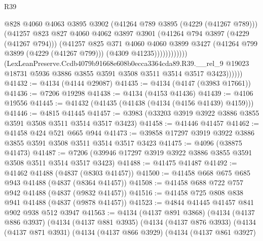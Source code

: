 \begin{lexlean}{R39}
\begin{coremodule}
                                @828
                                @4060
                                @4063
                                @3895
                                @3902
                                (@41264 @789 @3895 (@4229 (@41267 @789)))
                                (@41257
                                  @823
                                  @827
                                  @4060
                                  @4062
                                  @3897
                                  @3901
                                  (@41264 @794 @3897 (@4229 (@41267 @794)))
                                  (@41257
                                    @825
                                    @371
                                    @4060
                                    @4060
                                    @3899
                                    @3427
                                    (@41264 @799 @3899 (@4229 (@41267 @799)))
                                    (@4309 @41235))))))))))))
              (LexLeanPreserve.Ccdb4079b91668e608b0ecca3364cda89.R39.__rel_9
                @19023
                @18731
                @5936
                @3886
                @3855
                @3591
                @3508
                @3511
                @3514
                @3517
                @3423))))))
@41432 := @4134 (@4144 @29087)
@41435 := @4134 (@4147 (@3983 @17661))
@41436 := @7206 @19298
@41438 := @4134 (@4153 @41436)
@41439 := @4106 @19556
@41445 := @41432 (@41435 (@41438 (@4134 (@4156 @41439) @4159)))
@41446 := @4815 @41445
@41457 := @3983 (@33203 @3919 @3922 @3886 @3855 @3591 @3508 @3511 @3514 @3517 @3423)
@41458 := @41446 @41457
@41462 := @41458 @424 @521 @665 @944
@41473 := @39858 @17297 @3919 @3922 @3886 @3855 @3591 @3508 @3511 @3514 @3517 @3423
@41475 := @4096 (@38875 @41473)
@41487 := @7206 (@39946 @17297 @3919 @3922 @3886 @3855 @3591 @3508 @3511 @3514 @3517 @3423)
@41488 := @41475 @41487
@41492 := @41462 @41488 (@4837 (@8303 @41457))
@41500 := @41458 @668 @675 @685 @943 @41488 (@4837 (@8364 @41457))
@41508 := @41458 @688 @722 @757 @942 @41488 (@4837 (@9832 @41457))
@41516 := @41458 @725 @808 @838 @941 @41488 (@4837 (@9878 @41457))
@41523 := @4844 @41445 @41457 @841 @902 @938 @512 @3947
@41563 := @4134
    (@4137 @891 @3868)
    (@4134
      (@4137 @886 @3937)
      (@4134
        (@4137 @881 @3935)
        (@4134
          (@4137 @876 @3933)
          (@4134
            (@4137 @871 @3931)
            (@4134
              (@4137 @866 @3929)
              (@4134
                (@4137 @861 @3927)

\end{coremodule}
\end{lexlean}
